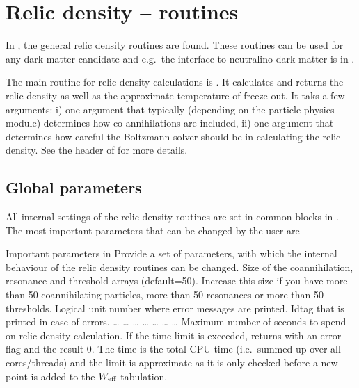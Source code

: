 \section{Relic density -- routines}

In , the general relic density routines are found. These
routines can be used for any dark matter candidate and e.g.\ the interface
to neutralino dark matter is in . 

The main routine for relic density calculations is . It calculates and returns the relic density as well as the approximate temperature of freeze-out. It taks a few arguments: i) one  argument that typically (depending on the particle physics module) determines how co-annihilations are included, ii) one  argument that determines how careful the Boltzmann solver should be in calculating the relic density. See the header of  for more details.


\subsection{Global parameters}

All internal settings of the relic density routines are set in common
blocks in . The most important parameters that can be
changed by the user are

\begin{sub}{Important parameters in }
   Provide a set of parameters, with which the internal
  behaviour of the relic density routines can be changed.
   Size of the coannihilation, resonance and threshold
    arrays (default=50). Increase this size if you have more than 50
    coannihilating particles, more than 50 resonances or more than 50
    thresholds.
   Logical unit number where error messages are
    printed.
   Idtag that is printed in case of errors.
   \ldots
   \ldots
   \ldots
   \ldots
   \ldots
   \ldots
   \ldots
   Maximum number of seconds to spend on relic density calculation. If the time limit is exceeded,  returns with an error flag and the result 0. The time is the total CPU time (i.e.\ summed up over all cores/threads) and the limit is approximate as it is only checked before a new point is added to the $W_{\rm eff}$ tabulation.
\end{sub}


